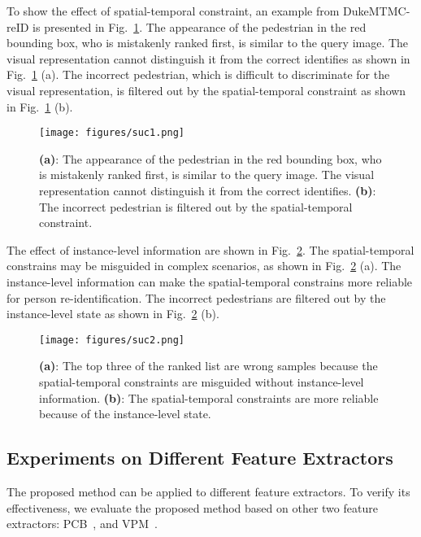 \documentclass[10pt,twocolumn,letterpaper]{article}
\begin{document}
To show the effect of spatial-temporal constraint, an example from DukeMTMC-reID is presented in Fig.~\ref{fig:suc1}.
The appearance of the pedestrian in the red bounding box, who is mistakenly ranked first, is similar to the query image. The visual representation cannot distinguish it from the correct identifies as shown in Fig.~\ref{fig:suc1} (a).
The incorrect pedestrian, which is difficult to discriminate for the visual representation, is filtered out by the spatial-temporal constraint as shown in Fig.~\ref{fig:suc1} (b).


\begin{figure}[t]
\begin{center}
   \texttt{[image: figures/suc1.png]}
\end{center}
\vspace{-0.3cm}
   \caption {\textbf{(a)}: The appearance of the pedestrian in the red bounding box, who is mistakenly ranked first, is similar to the query image. The visual representation cannot distinguish it from the correct identifies. \textbf{(b)}: The incorrect pedestrian is filtered out by the spatial-temporal constraint.}
\label{fig:suc1}
\end{figure}

The effect of instance-level information are shown in Fig.~\ref{fig:suc2}.
The spatial-temporal constrains may be misguided in complex scenarios, as shown in Fig.~\ref{fig:suc2} (a).
The instance-level information can make the spatial-temporal constrains more reliable for person re-identification.
The incorrect pedestrians are filtered out by the instance-level state as shown in Fig.~\ref{fig:suc2} (b).

\begin{figure}[t]
\begin{center}
   \texttt{[image: figures/suc2.png]}
\end{center}
\vspace{-0.3cm}
   \caption {\textbf{(a)}: The top three of the ranked list are wrong samples because the spatial-temporal constraints are misguided without instance-level information. \textbf{(b)}: The spatial-temporal constraints are more reliable because of the instance-level state.}
\label{fig:suc2}
\vspace{-0.3cm}
\end{figure}





\subsection{Experiments on Different Feature Extractors}
\vspace{-0.15cm}
The proposed method can be applied to different feature extractors.
To verify its effectiveness, we evaluate the proposed method based on other two feature extractors: PCB~\cite{2017Beyond}, and VPM~\cite{Perceive2020Perceive}.
\end{document}
